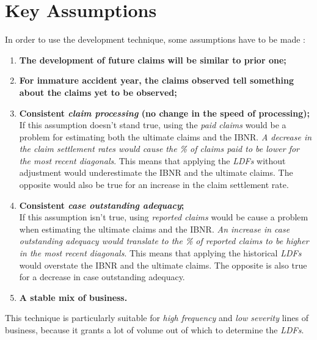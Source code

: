 \documentclass[11pt, english]{memoir}
\numberwithin{definition}{section}
\begin{document}
\section{Key Assumptions}
In order to use the development technique, some assumptions have to be made :
\begin{enumerate}
	\item \textbf{The development of future claims will be similar to prior one;}
	\item \textbf{For immature accident year, the claims observed tell something about the claims yet to be observed;}
	\item \textbf{Consistent \emph{claim processing} (no change in the speed of processing);}\\
	If this assumption doesn't stand true, using the \emph{paid claims} would be a problem for estimating both the ultimate claims and the IBNR.\emph{ A decrease in the claim settlement rates would cause the \% of claims paid to be lower for the most recent diagonals}. This means that applying the \emph{LDFs} without adjustment would underestimate the IBNR and the ultimate claims. The opposite would also be true for an increase in the claim settlement rate. \\
	\item \textbf{Consistent \emph{case outstanding adequacy};}\\
	If this assumption isn't true, using \emph{reported claims} would be cause a problem when estimating the ultimate claims and the IBNR. \emph{An increase in case outstanding adequacy would translate to the \% of reported claims to be higher in the most recent diagonals}. This means that applying the historical \emph{LDFs} would overstate the IBNR and the ultimate claims. The opposite is also true for a decrease in case outstanding adequacy. 
	
	\item \textbf{A stable mix of business.}
\end{enumerate}

This technique is particularly suitable for \emph{high frequency} and \emph{low severity} lines of business, because it grants a lot of volume out of which to determine the \emph{LDFs}. 
\end{document}
